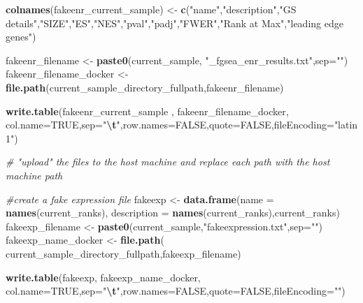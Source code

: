 \documentclass[
]{book}
\newenvironment{Shaded}{\begin{snugshade}}{\end{snugshade}}
\newcommand{\AttributeTok}[1]{\textcolor[rgb]{0.13,0.29,0.53}{#1}}
\newcommand{\CommentTok}[1]{\textcolor[rgb]{0.56,0.35,0.01}{\textit{#1}}}
\newcommand{\ConstantTok}[1]{\textcolor[rgb]{0.56,0.35,0.01}{#1}}
\newcommand{\FunctionTok}[1]{\textcolor[rgb]{0.13,0.29,0.53}{\textbf{#1}}}
\newcommand{\NormalTok}[1]{#1}
\newcommand{\OtherTok}[1]{\textcolor[rgb]{0.56,0.35,0.01}{#1}}
\newcommand{\SpecialCharTok}[1]{\textcolor[rgb]{0.81,0.36,0.00}{\textbf{#1}}}
\newcommand{\StringTok}[1]{\textcolor[rgb]{0.31,0.60,0.02}{#1}}
\begin{document}
\begin{Shaded}
\begin{Highlighting}[]
    \FunctionTok{colnames}\NormalTok{(fakeenr\_current\_sample) }\OtherTok{\textless{}{-}} \FunctionTok{c}\NormalTok{(}\StringTok{"name"}\NormalTok{,}\StringTok{"description"}\NormalTok{,}\StringTok{"GS details"}\NormalTok{,}\StringTok{"SIZE"}\NormalTok{,}\StringTok{"ES"}\NormalTok{,}\StringTok{"NES"}\NormalTok{,}\StringTok{"pval"}\NormalTok{,}\StringTok{"padj"}\NormalTok{,}\StringTok{"FWER"}\NormalTok{,}\StringTok{"Rank at Max"}\NormalTok{,}\StringTok{"leading edge genes"}\NormalTok{)}
    
\NormalTok{    fakeenr\_filename }\OtherTok{\textless{}{-}} \FunctionTok{paste0}\NormalTok{(current\_sample, }\StringTok{"\_fgsea\_enr\_results.txt"}\NormalTok{,}\AttributeTok{sep=}\StringTok{""}\NormalTok{)}
\NormalTok{    fakeenr\_filename\_docker }\OtherTok{\textless{}{-}} \FunctionTok{file.path}\NormalTok{(current\_sample\_directory\_fullpath,fakeenr\_filename)}
    
    \FunctionTok{write.table}\NormalTok{(fakeenr\_current\_sample ,}
\NormalTok{                fakeenr\_filename\_docker,}
                \AttributeTok{col.name=}\ConstantTok{TRUE}\NormalTok{,}\AttributeTok{sep=}\StringTok{"}\SpecialCharTok{\textbackslash{}t}\StringTok{"}\NormalTok{,}\AttributeTok{row.names=}\ConstantTok{FALSE}\NormalTok{,}\AttributeTok{quote=}\ConstantTok{FALSE}\NormalTok{,}\AttributeTok{fileEncoding=}\StringTok{"latin1"}\NormalTok{)}
    
    \CommentTok{\# "upload" the files to the host machine and replace each path with the host machine path}
    
    \CommentTok{\#create a fake expression file}
\NormalTok{    fakeexp }\OtherTok{\textless{}{-}} \FunctionTok{data.frame}\NormalTok{(}\AttributeTok{name =} \FunctionTok{names}\NormalTok{(current\_ranks), }
                          \AttributeTok{description =} \FunctionTok{names}\NormalTok{(current\_ranks),current\_ranks)}
\NormalTok{    fakeexp\_filename }\OtherTok{\textless{}{-}} \FunctionTok{paste0}\NormalTok{(current\_sample,}\StringTok{"fakeexpression.txt"}\NormalTok{,}\AttributeTok{sep=}\StringTok{""}\NormalTok{)}
\NormalTok{    fakeexp\_name\_docker }\OtherTok{\textless{}{-}} \FunctionTok{file.path}\NormalTok{( current\_sample\_directory\_fullpath,fakeexp\_filename)}

    \FunctionTok{write.table}\NormalTok{(fakeexp,}
\NormalTok{                fakeexp\_name\_docker,}
                \AttributeTok{col.name=}\ConstantTok{TRUE}\NormalTok{,}\AttributeTok{sep=}\StringTok{"}\SpecialCharTok{\textbackslash{}t}\StringTok{"}\NormalTok{,}\AttributeTok{row.names=}\ConstantTok{FALSE}\NormalTok{,}\AttributeTok{quote=}\ConstantTok{FALSE}\NormalTok{,}\AttributeTok{fileEncoding=}\StringTok{""}\NormalTok{)}
    

\end{Highlighting}
\end{Shaded}
\end{document}
